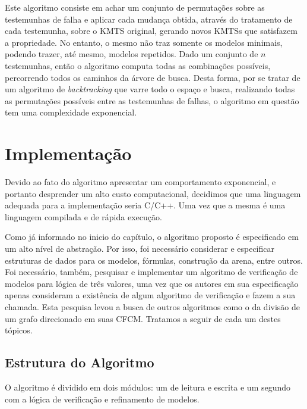 \documentclass[normaltoc,capchap,capsec,times]{abnt}
\begin{document}
Este algoritmo consiste em achar um conjunto de permutações sobre as testemunhas de falha e aplicar cada mudança obtida, através do tratamento de cada testemunha, sobre o KMTS original, gerando novos KMTSs que satisfazem a propriedade. No entanto, o mesmo não traz somente os modelos minimais, podendo trazer, até mesmo, modelos repetidos. Dado um conjunto de $n$ testemunhas, então o algoritmo computa todas as combinações possíveis, percorrendo todos os caminhos da árvore de busca. Desta forma, por se tratar de um algoritmo de \textit{backtracking} que varre todo o espaço e busca, realizando todas as permutações possíveis entre as testemunhas de falhas, o algoritmo em questão tem uma complexidade exponencial.

\section{Implementação}
\label{sec:implementacao}

Devido ao fato do algoritmo apresentar um comportamento exponencial, e portanto desprender um alto custo computacional, decidimos que uma linguagem adequada para a implementação seria C/C++. Uma vez que a mesma é uma linguagem compilada e de rápida execução. 

Como já informado no inicio do capítulo, o algoritmo proposto é especificado em um alto nível de abstração. Por isso, foi necessário considerar e especificar estruturas de dados para os modelos, fórmulas, construção da arena, entre outros. Foi necessário, também, pesquisar e implementar um algoritmo de verificação de modelos para lógica de três valores, uma vez que os autores em sua especificação apenas consideram a existência de algum algoritmo de verificação e fazem a sua chamada. Esta pesquisa levou a busca de outros algoritmos como o da divisão de um grafo direcionado em suas CFCM. Tratamos a seguir de cada um destes tópicos.

\subsection{Estrutura do Algoritmo}

O algoritmo é dividido em dois módulos: um de leitura e escrita e um segundo com a lógica de verificação e refinamento de modelos. 
\end{document}
